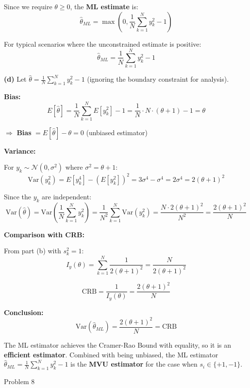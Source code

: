 \documentclass[12pt,a4paper,onecolumn]{exam}
\newcommand{\questionheader}[1]{%
  \begin{tcolorbox}[
    enhanced,
    colback=black,
    coltext=white,
    boxrule=0pt,
    fontupper=\Large\bfseries,
    arc=4mm
  ]
  #1
  \end{tcolorbox}%
}
\begin{document}
\begin{solution}
Since we require $\theta \geq 0$, the \textbf{ML estimate} is:
\[
\boxed{\hat{\theta}_{ML} = \max\left(0, \frac{1}{N}\sum_{k=1}^{N} y_k^2 - 1\right)}
\]

For typical scenarios where the unconstrained estimate is positive:
\[
\hat{\theta}_{ML} = \frac{1}{N}\sum_{k=1}^{N} y_k^2 - 1
\]

\vspace{1em}
\textbf{(d)} Let $\hat{\theta} = \frac{1}{N}\sum_{k=1}^{N} y_k^2 - 1$ (ignoring the boundary constraint for analysis).

\textbf{Bias:}
\[
E[\hat{\theta}] = \frac{1}{N}\sum_{k=1}^{N} E[y_k^2] - 1 = \frac{1}{N} \cdot N \cdot (\theta + 1) - 1 = \theta
\]

$\Rightarrow$ \textbf{Bias} $= E[\hat{\theta}] - \theta = 0$ (unbiased estimator)

\textbf{Variance:}

For $y_k \sim \mathcal{N}(0, \sigma^2)$ where $\sigma^2 = \theta + 1$:
\[
\text{Var}(y_k^2) = E[y_k^4] - (E[y_k^2])^2 = 3\sigma^4 - \sigma^4 = 2\sigma^4 = 2(\theta + 1)^2
\]

Since the $y_k$ are independent:
\[
\text{Var}(\hat{\theta}) = \text{Var}\left(\frac{1}{N}\sum_{k=1}^{N} y_k^2\right) = \frac{1}{N^2}\sum_{k=1}^{N} \text{Var}(y_k^2) = \frac{N \cdot 2(\theta + 1)^2}{N^2} = \frac{2(\theta + 1)^2}{N}
\]

\textbf{Comparison with CRB:}

From part (b) with $s_k^2 = 1$:
\[
I_y(\theta) = \sum_{k=1}^{N} \frac{1}{2(\theta + 1)^2} = \frac{N}{2(\theta + 1)^2}
\]

\[
\text{CRB} = \frac{1}{I_y(\theta)} = \frac{2(\theta + 1)^2}{N}
\]

\textbf{Conclusion:}
\[
\boxed{\text{Var}(\hat{\theta}_{ML}) = \frac{2(\theta + 1)^2}{N} = \text{CRB}}
\]

The ML estimator achieves the Cramer-Rao Bound with equality, so it is an \textbf{efficient estimator}. Combined with being unbiased, the ML estimator $\hat{\theta}_{ML} = \frac{1}{N}\sum_{k=1}^{N} y_k^2 - 1$ is the \textbf{MVU estimator} for the case when $s_i \in \{+1, -1\}$.
\end{solution}

\questionheader{Problem 8}
\end{document}

